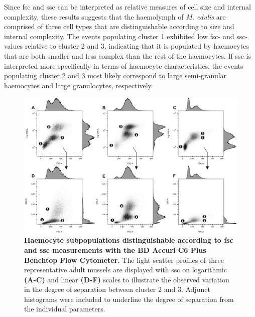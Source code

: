 Since \acrshort{fsc} and \acrshort{ssc} can be interpreted as relative measures of cell size and internal complexity, these results suggests that the haemolymph of \emph{M. edulis} are comprised of three cell types that are distinguishable according to size and internal complexity. The events populating cluster 1 exhibited low \acrshort{fsc}- and \acrshort{ssc}-values relative to cluster 2 and 3, indicating that it is populated by haemocytes that are both smaller and less complex than the rest of the haemocytes. If \acrshort{ssc} is interpreted more specifically in terms of haemocyte characteristics, the events populating cluster 2 and 3 most likely correspond to large semi-granular haemocytes and large granulocytes, respectively.

\begin{figure}[!ht]
    \centering
    \includegraphics[width=1.0\textwidth]{figures/Gating strategy/30k scatter profiles musc.pdf}
    \caption{\textbf{Haemocyte subpopulations distinguishable according to \acrshort{fsc} and \acrshort{ssc} measurements with the BD Accuri C6 Plus Benchtop Flow Cytometer.} The light-scatter profiles of three representative adult mussels are displayed with \acrshort{ssc} on logarithmic \textbf{(A-C)} and linear \textbf{(D-F)} scales to illustrate the observed variation in the degree of separation between cluster 2 and 3. Adjunct histograms were included to underline the degree of separation from the individual parameters.}
    \label{fig:fsc_vs_ssc}
\end{figure}

